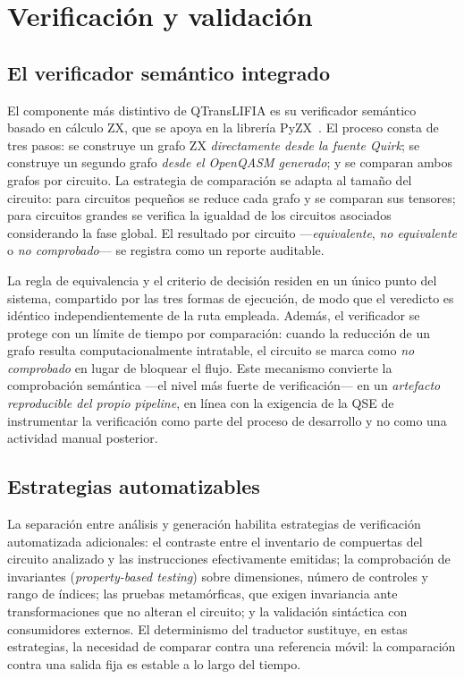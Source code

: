 \documentclass[11pt,a4paper]{article}
\begin{document}
\section{Verificación y validación}
\label{sec:verificacion}

\subsection{El verificador semántico integrado}

El componente más distintivo de QTransLIFIA es su verificador semántico basado en cálculo
ZX, que se apoya en la librería PyZX~\cite{kissinger2020pyzx}. El proceso consta de tres
pasos: se construye un grafo ZX \emph{directamente desde la fuente Quirk}; se construye un
segundo grafo \emph{desde el OpenQASM generado}; y se comparan ambos grafos por circuito. La
estrategia de comparación se adapta al tamaño del circuito: para circuitos pequeños se
reduce cada grafo y se comparan sus tensores; para circuitos grandes se verifica la igualdad
de los circuitos asociados considerando la fase global. El resultado por circuito
---\emph{equivalente}, \emph{no equivalente} o \emph{no comprobado}--- se registra como un
reporte auditable.

La regla de equivalencia y el criterio de decisión residen en un único punto del sistema,
compartido por las tres formas de ejecución, de modo que el veredicto es idéntico
independientemente de la ruta empleada. Además, el verificador se protege con un límite de
tiempo por comparación: cuando la reducción de un grafo resulta computacionalmente
intratable, el circuito se marca como \emph{no comprobado} en lugar de bloquear el flujo.
Este mecanismo convierte la comprobación semántica ---el nivel más fuerte de verificación---
en un \emph{artefacto reproducible del propio pipeline}, en línea con la exigencia de la QSE
de instrumentar la verificación como parte del proceso de desarrollo y no como una actividad
manual posterior.

\subsection{Estrategias automatizables}

La separación entre análisis y generación habilita estrategias de verificación automatizada
adicionales: el contraste entre el inventario de compuertas del circuito analizado y las
instrucciones efectivamente emitidas; la comprobación de invariantes (\emph{property-based
testing}) sobre dimensiones, número de controles y rango de índices; las pruebas
metamórficas, que exigen invariancia ante transformaciones que no alteran el circuito; y la
validación sintáctica con consumidores externos. El determinismo del traductor sustituye,
en estas estrategias, la necesidad de comparar contra una referencia móvil: la comparación
contra una salida fija es estable a lo largo del tiempo.
\end{document}
